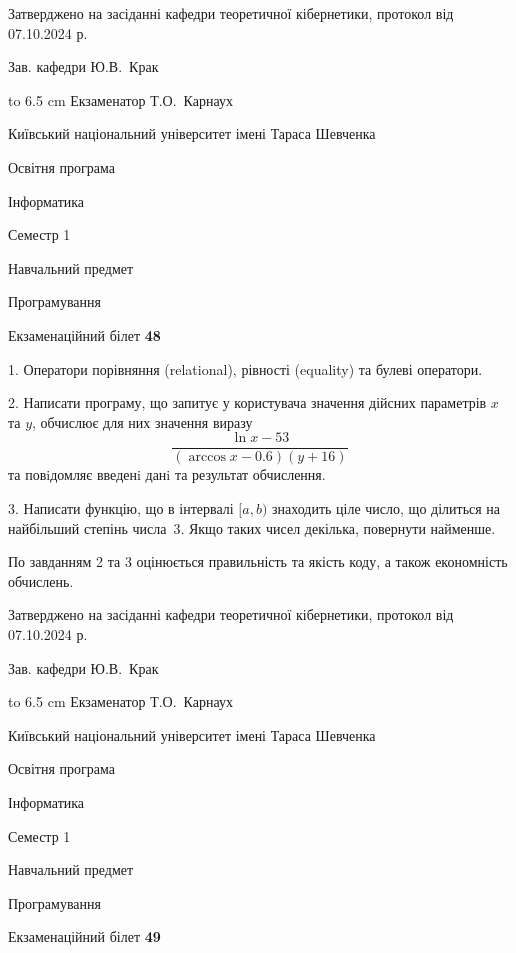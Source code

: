 \documentclass[12pt, ukrainian]{article}
\begin{document}
{\smallskip\smallskip \begin {scriptsize} Затверджено на засіданні кафедри теоретичної кібернетики, протокол   від   07.10.2024 р.\par\smallskip\smallskip\smallskip\smallskip
{\parbox {6.5 cm} {Зав. кафедри \dotfill Ю.В.~Крак}}\hspace {0.7cm} {\hbox to 6.5 cm { Екзаменатор \dotfill Т.О.~Карнаух}} \end{scriptsize}}
\vspace{0.9cm}
{{\begin {scriptsize}\par
{ \center  Київський національний університет імені Тараса Шевченка \par}
{\parbox {5 cm}{Освітня програма \hfill}{\parbox {7 cm}{Інформатика\hfill}}\parbox {6 cm}{\hfill Семестр 1}}\par
{\parbox {5 cm} {Навчальний предмет \hfill}\parbox {7 cm}{Програмування \hfill}\parbox {6cm}{\hfill}\par}\vspace{-15pt} \end{scriptsize}}{\center Екзаменаційний білет \No \textbf { 48 }\par}}
{%
1. Оператори порівняння (relational), рівності (equality) та булеві оператори.%
\par
2. Написати програму, що запитує у користувача значення дійсних параметрів $x$ та $y$, обчислює для них значення виразу 
$$\frac{\ln x - 53}{(\arccos x - 0.6) (y + 16)}$$ 
та повiдомляє введенi данi та результат обчислення.

\par
3. Написати функцію, що в інтервалі $[a, b)$ знаходить ціле число, що ділиться на найбільший степінь числа 3. Якщо таких чисел декілька, повернути найменше.

По завданням 2 та 3 оцінюється правильність та якість коду, а також економність обчислень.

}
{\smallskip\smallskip \begin {scriptsize} Затверджено на засіданні кафедри теоретичної кібернетики, протокол   від   07.10.2024 р.\par\smallskip\smallskip\smallskip\smallskip
{\parbox {6.5 cm} {Зав. кафедри \dotfill Ю.В.~Крак}}\hspace {0.7cm} {\hbox to 6.5 cm { Екзаменатор \dotfill Т.О.~Карнаух}} \end{scriptsize}}
\newpage
{{\begin {scriptsize}\par
{ \center  Київський національний університет імені Тараса Шевченка \par}
{\parbox {5 cm}{Освітня програма \hfill}{\parbox {7 cm}{Інформатика\hfill}}\parbox {6 cm}{\hfill Семестр 1}}\par
{\parbox {5 cm} {Навчальний предмет \hfill}\parbox {7 cm}{Програмування \hfill}\parbox {6cm}{\hfill}\par}\vspace{-15pt} \end{scriptsize}}{\center Екзаменаційний білет \No \textbf { 49 }\par}}
\end{document}
